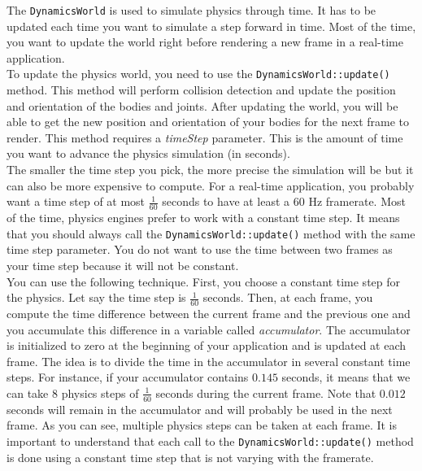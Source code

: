 \documentclass[a4paper,12pt]{article}
\begin{document}
    The \texttt{DynamicsWorld} is used to simulate physics through time. It has to be updated each time you want to simulate a step forward in time. Most of the time,
    you want to update the world right before rendering a new frame in a real-time application. \\

    To update the physics world, you need to use the \texttt{DynamicsWorld::update()} method. This method will perform collision detection and update the
    position and orientation of the bodies and joints. After updating the world, you will be able to get the new position and orientation of your bodies for the next
    frame to render. This method requires a \emph{timeStep} parameter. This is the amount of time you want to advance the physics simulation (in seconds). \\

    The smaller the time step you pick, the more precise the simulation will be but it can also be more expensive to compute. For a real-time application, you
    probably want a time step of at most $\frac{1}{60}$ seconds to
    have at least a 60 Hz framerate. Most of the time, physics engines prefer to work with a constant time step. It means that you should always call
    the \texttt{DynamicsWorld::update()} method with the same time step parameter. You do not want to use the time between two frames as your time step because it will
    not be constant. \\

    You can use the following technique. First, you choose a constant time step for the physics. Let say the time step is $\frac{1}{60}$ seconds. Then, at each frame,
    you compute the time difference between the current frame and the previous one and you accumulate this difference in a variable called \emph{accumulator}. The accumulator
    is initialized to zero at the beginning of your application and is updated at each frame. The idea is to divide the time in the accumulator in several constant time steps.
    For instance, if your accumulator contains $0.145$ seconds, it means that we can take $8$ physics steps of $\frac{1}{60}$ seconds during the current frame. Note that
    $0.012$ seconds will remain in the accumulator and will probably be used in the next frame. As you can see, multiple physics steps can be taken at each frame. It is
    important to understand that each call to the \texttt{DynamicsWorld::update()} method is done using a constant time step that is not varying with the framerate. \\
\end{document}
